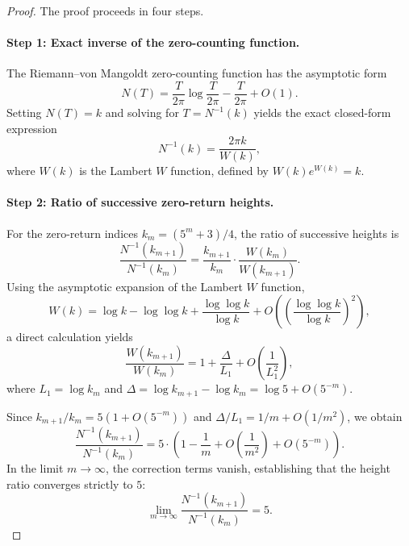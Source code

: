 \documentclass[12pt,a4paper]{article}
\begin{document}
\begin{proof}
The proof proceeds in four steps.

\paragraph{Step 1: Exact inverse of the zero-counting function.}
The Riemann--von Mangoldt zero-counting function has the asymptotic form
\begin{equation}
N(T) = \frac{T}{2\pi} \log \frac{T}{2\pi} - \frac{T}{2\pi} + O(1).
\end{equation}
Setting $N(T) = k$ and solving for $T = N^{-1}(k)$ yields the exact closed-form expression
\begin{equation}
N^{-1}(k) = \frac{2\pi k}{W(k)},
\end{equation}
where $W(k)$ is the Lambert $W$ function, defined by $W(k)e^{W(k)} = k$.

\paragraph{Step 2: Ratio of successive zero-return heights.}
For the zero-return indices $k_m = (5^m+3)/4$, the ratio of successive heights is
\begin{equation}
\frac{N^{-1}(k_{m+1})}{N^{-1}(k_m)} = \frac{k_{m+1}}{k_m} \cdot \frac{W(k_m)}{W(k_{m+1})}.
\end{equation}
Using the asymptotic expansion of the Lambert $W$ function,
\begin{equation}
W(k) = \log k - \log \log k + \frac{\log \log k}{\log k} + O\left(\left(\frac{\log \log k}{\log k}\right)^2\right),
\end{equation}
a direct calculation yields
\begin{equation}
\frac{W(k_{m+1})}{W(k_m)} = 1 + \frac{\Delta}{L_1} + O\left(\frac{1}{L_1^2}\right),
\end{equation}
where $L_1 = \log k_m$ and $\Delta = \log k_{m+1} - \log k_m = \log 5 + O(5^{-m})$.

Since $k_{m+1}/k_m = 5(1 + O(5^{-m}))$ and $\Delta/L_1 = 1/m + O(1/m^2)$, we obtain
\begin{equation}
\frac{N^{-1}(k_{m+1})}{N^{-1}(k_m)} = 5 \cdot \left(1 - \frac{1}{m} + O\left(\frac{1}{m^2}\right) + O(5^{-m})\right).
\end{equation}
In the limit $m \to \infty$, the correction terms vanish, establishing that the height ratio converges strictly to $5$:
\begin{equation}
\lim_{m \to \infty} \frac{N^{-1}(k_{m+1})}{N^{-1}(k_m)} = 5.
\label{eq:height-ratio}
\end{equation}


\end{proof}
\end{document}
